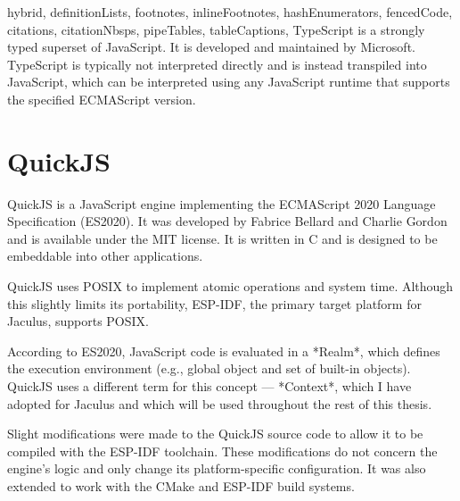 \begin{markdown*}{%
  hybrid,
  definitionLists,
  footnotes,
  inlineFootnotes,
  hashEnumerators,
  fencedCode,
  citations,
  citationNbsps,
  pipeTables,
  tableCaptions,
}
TypeScript is a strongly typed superset of JavaScript. It is developed and maintained by Microsoft. TypeScript is typically not interpreted directly and is instead transpiled into JavaScript, which can be interpreted using any JavaScript runtime that supports the specified ECMAScript version.

\section{QuickJS}

QuickJS is a JavaScript engine implementing the ECMAScript 2020 Language Specification\cite{es2020} (ES2020). It was developed by Fabrice Bellard and Charlie Gordon and is available under the MIT license. It is written in C and is designed to be embeddable into other applications.

QuickJS uses POSIX to implement atomic operations and system time. Although this slightly limits its portability, ESP-IDF, the primary target platform for Jaculus, supports POSIX.

According to ES2020, JavaScript code is evaluated in a *Realm*, which defines the execution environment (e.g., global object and set of built-in objects). QuickJS uses a different term for this concept --- *Context*, which I have adopted for Jaculus and which will be used throughout the rest of this thesis.

Slight modifications were made to the QuickJS source code to allow it to be compiled with the ESP-IDF toolchain. These modifications do not concern the engine's logic and only change its platform-specific configuration. It was also extended to work with the CMake and ESP-IDF build systems.


\end{markdown*}
